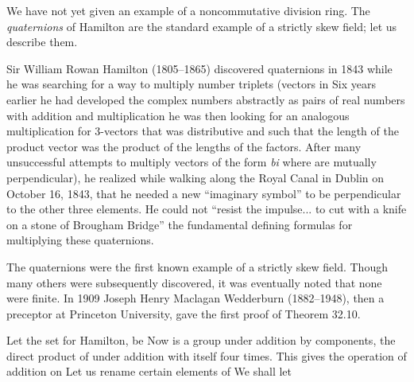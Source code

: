 \documentclass[11pt,oneside]{article}
\begin{document}
\begin{BookBody}


\noindent We have not yet given an example of a noncommutative division ring. The\textit{ quaternions} of Hamilton are the standard example of a strictly skew field; let us describe them.


\noindent Sir William Rowan Hamilton (1805–1865) discovered quaternions in 1843 while he was searching for a way to multiply number triplets (vectors in  Six years earlier he had developed the complex numbers abstractly as pairs  of real numbers with addition   and multiplication   he was then looking for an analogous multiplication for 3-vectors that was distributive and such that the length of the product vector was the product of the lengths of the factors. After many unsuccessful attempts to multiply vectors of the form  \textit{bi} where  are mutually perpendicular), he realized while walking along the Royal Canal in Dublin on October 16, 1843, that he needed a new “imaginary symbol”  to be perpendicular to the other three elements. He could not “resist the impulse... to cut with a knife on a stone of Brougham Bridge” the fundamental defining formulas for multiplying these quaternions.

The quaternions were the first known example of a strictly skew field. Though many others were subsequently discovered, it was eventually noted that none were finite. In 1909 Joseph Henry Maclagan Wedderburn (1882–1948), then a preceptor at Princeton University, gave the first proof of Theorem 32.10.

Let the set  for Hamilton, be  Now  is a group under addition by components, the direct product of  under addition with itself four times. This gives the operation of addition on  Let us rename certain elements of  We shall let


\end{BookBody}
\end{document}
